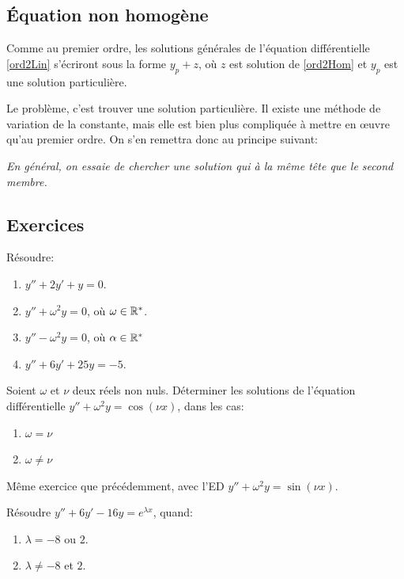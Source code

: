 \documentclass[../main.tex]{subfiles}
\begin{document}
\subsection{Équation non homogène}

Comme au premier ordre, les solutions générales de l'équation différentielle \eqref{ord2Lin} s'écriront sous la forme $y_p+z$, où $z$ est solution de \eqref{ord2Hom} et $y_p$ est une solution particulière.

Le problème, c'est trouver une solution particulière. Il existe une méthode de variation de la constante, mais elle est bien plus compliquée à mettre en œuvre qu'au premier ordre. On s'en remettra donc au principe suivant:

\textit{En général, on essaie de chercher une solution qui à la même tête que le second membre.}

\subsection{Exercices}

\begin{exo}Résoudre:
	\begin{multicols}{2}
		\begin{enumerate}
			\item $y'' + 2y' + y = 0$.
			\item $y'' + \omega^2y = 0$, où $\omega\in\mathbb R^*$.
			\item $y'' - \omega^2y = 0$, où $\alpha\in\mathbb R^*$
			\item $y'' + 6y' + 25y = -5$.
		\end{enumerate}
	\end{multicols}
\end{exo}

\begin{exo}
	Soient $\omega$ et $\nu$ deux réels non nuls. Déterminer les solutions de l'équation différentielle $y''+\omega^2y = \cos(\nu x)$, dans les cas:\begin{enumerate}
		\item $\omega=\nu$
		\item $\omega\neq\nu$
	\end{enumerate}
\end{exo}

\begin{exo}
	Même exercice que précédemment, avec l'ED $y'' + \omega^2y = \sin(\nu x)$.
\end{exo}

\begin{exo}
	Résoudre $y''+6y'-16y = e^{\lambda x}$, quand:\begin{enumerate}
		\item $\lambda = -8$ ou $2$.
		\item $\lambda\neq -8$ et $2$.
	\end{enumerate}
\end{exo}
\end{document}
